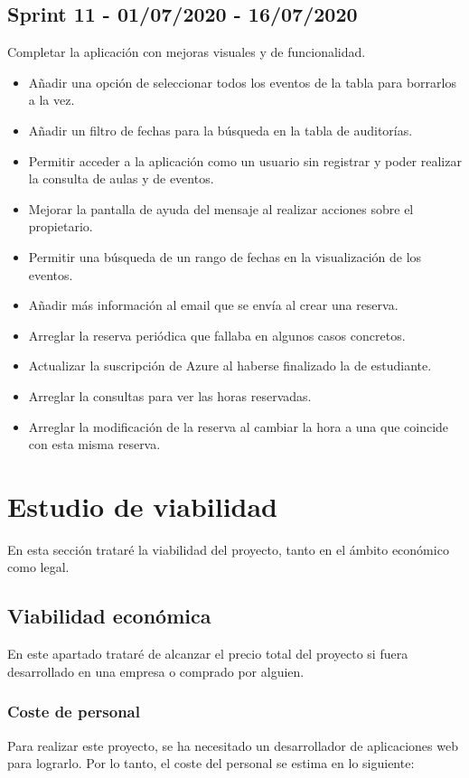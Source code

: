 \subsection{Sprint 11 - 01/07/2020 - 16/07/2020 }
Completar la aplicación con mejoras visuales y de funcionalidad.
\begin{itemize}
    \item Añadir una opción de seleccionar todos los eventos de la tabla para borrarlos a la vez.
    \item Añadir un filtro de fechas para la búsqueda en la tabla de auditorías.
    \item Permitir acceder a la aplicación como un usuario sin registrar y poder realizar la consulta de aulas y de eventos.
    \item Mejorar la pantalla de ayuda del mensaje al realizar acciones sobre el propietario.
    \item Permitir una búsqueda de un rango de fechas en la visualización de los eventos.
    \item Añadir más información al email que se envía al crear una reserva.
    \item Arreglar la reserva periódica que fallaba en algunos casos concretos.
    \item Actualizar la suscripción de Azure al haberse finalizado la de estudiante.
    \item Arreglar la consultas para ver las horas reservadas.
    \item Arreglar la modificación de la reserva al cambiar la hora a una que coincide con esta misma reserva.
\end{itemize}
\section{Estudio de viabilidad}
En esta sección trataré la viabilidad del proyecto, tanto en el ámbito económico como legal.
\subsection{Viabilidad económica}
En este apartado trataré de alcanzar el precio total del proyecto si fuera desarrollado en una empresa o comprado por alguien.\newline
\subsubsection{Coste de personal}
Para realizar este proyecto, se ha necesitado un desarrollador de aplicaciones web para lograrlo. Por lo tanto, el coste del personal se estima en lo siguiente:\newline
